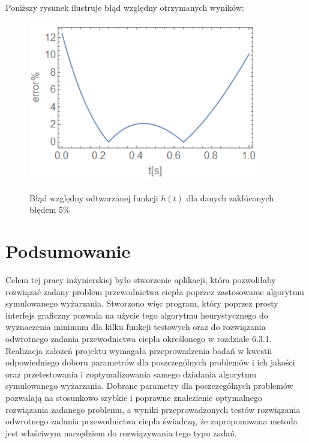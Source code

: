 \documentclass[twoside]{projektInzynierskiMS1}
\newcommand{\si}{ś}
\begin{document}
Poniższy rysunek ilustruje błąd względny otrzymanych wyników:

\begin{figure}[H]
\begin{center}
		\includegraphics[height=7cm, width=10cm]{pics/5abs.png}\\
	\caption{Błąd względny odtwarzanej funkcji $h(t)$ dla danych zakłóconych błędem 5\%}
\end{center}
\end{figure}



\section{Podsumowanie}
Celem tej pracy inżynierskiej było stworzenie aplikacji, która pozwoliłaby rozwiązać zadany problem przewodnictwa ciepła poprzez zastosowanie algorytmu symulowanego wyżarzania. Stworzono więc program, który poprzez prosty interfejs graficzny pozwala na użycie tego algorytmu heurystycznego do wyznaczenia minimum dla kilku funkcji testowych oraz do rozwiązania odwrotnego zadania przewodnictwa ciepła okre\si lonego w rozdziale 6.3.1. \\

Realizacja założeń projektu wymagała przeprowadzenia badań w kwestii odpowiedniego doboru parametrów dla poszczególnych problemów i ich jako\si ci oraz przetestowania i zoptymalizowania samego działania algorytmu symulowanego wyżarzania. Dobrane parametry dla poszczególnych problemów pozwalają na stosunkowo szybkie i poprawne znalezienie optymalnego rozwiązania zadanego problemu, a wyniki przeprowadzonych testów rozwiązania odwrotnego zadania przewodnictwa ciepła \si wiadczą, że zaproponowana metoda jest wła\si ciwym narzędziem do rozwiązywania tego typu zadań. \\
\end{document}

